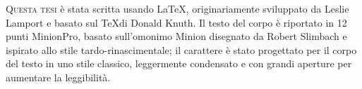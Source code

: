 \pagestyle{empty}
\null
\newpage

\vspace*{\fill}

\begin{center}
	
	
	\parbox{0.7\textwidth}{
		\lettrine[lines = 3, loversize = -0.1, lraise = 0.1]{\textcolor{school_red}{Q}}{uesta tesi} è stata scritta usando \LaTeX, originariamente sviluppato da Leslie Lamport e basato sul \TeX di Donald Knuth.
		Il testo del corpo è riportato in 12 punti MinionPro, basato sull'omonimo Minion disegnato da Robert Slimbach e ispirato allo stile tardo-rinascimentale; il carattere è stato progettato per il corpo del testo in uno stile classico, leggermente condensato e con grandi aperture per aumentare la leggibilità.
	}
	
	\vspace{3em}
	
\end{center}